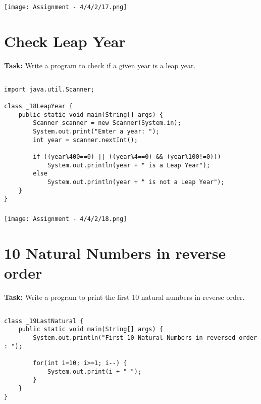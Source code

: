 \documentclass[12pt,a4paper]{article}
\begin{document}
\subsubsection{}
\begin{center}
    \texttt{[image: Assignment - 4/4/2/17.png]}
\end{center}


\section{Check Leap Year}
\textbf{Task:} Write a program to check if a given year is a leap year.

\subsection{}
\begin{lstlisting}
import java.util.Scanner;

class _18LeapYear {
    public static void main(String[] args) {
        Scanner scanner = new Scanner(System.in);
        System.out.print("Emter a year: ");
        int year = scanner.nextInt();
    
        if ((year%400==0) || ((year%4==0) && (year%100!=0)))
            System.out.println(year + " is a Leap Year");
        else
            System.out.println(year + " is not a Leap Year");
    }
}
\end{lstlisting}

\subsubsection{}
\begin{center}
    \texttt{[image: Assignment - 4/4/2/18.png]}
\end{center}


\section{10 Natural Numbers in reverse order}
\textbf{Task:} Write a program to print the first 10 natural numbers in reverse order.

\subsection{}
\begin{lstlisting}
class _19LastNatural {
    public static void main(String[] args) {
        System.out.println("First 10 Natural Numbers in reversed order : ");
    
        for(int i=10; i>=1; i--) {
            System.out.print(i + " ");
        }
    }
}
\end{lstlisting}
\end{document}
